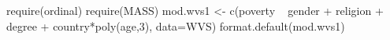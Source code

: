 \documentclass[
]{article}
\begin{document}
\begin{Schunk}
\begin{Sinput}
 require(ordinal)
 require(MASS)
 mod.wvs1 <- c(poverty ~ gender + religion + degree + country*poly(age,3),
                    data=WVS)
 format.default(mod.wvs1)
\end{Sinput}
\begin{Soutput}
                                                                                                                                                                                                                                                                                                                                                                                                                                                                                                                                                                                                                                                                                                                                                                                                                                                                                                                                                                                                                                                                                                                                                                                                                                                                                                                                                                                                                                                                                                                                                                                                                                                                                                                                                                                                                                                                                                                                                                                                                                                                                                                                                                                                                                                                                                                                                                                                                                                                                                                                                                                                                                                                                                                                                                                                                                                                                                                                                                                                                         
\end{Soutput}
\end{Schunk}
\end{document}

